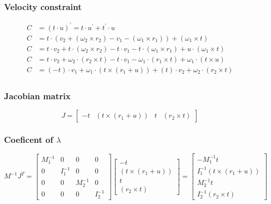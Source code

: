 \documentclass{article}
\begin{document}
	\subsubsection{Velocity constraint}
	\begin{align*}
		C &= (t\cdot u)^{'} = t\cdot u^{'} + t^{'}\cdot u\\
		C &= t\cdot (v_2+(\omega_2\times r_2)-v_1-(\omega_1\times r_1)) + (\omega_1\times t)\\
		C &= t\cdot v_2+ t\cdot (\omega_2\times r_2)- t\cdot v_1-t\cdot (\omega_1\times r_1) + u\cdot(\omega_1\times t)\\
		C &= t\cdot v_2+ \omega_2\cdot (r_2\times t)- t\cdot v_1-\omega_1\cdot (r_1\times t) + \omega_1\cdot(t\times u)\\
		C &= \boxed{(-t)}\cdot v_1 + \omega_1\cdot\boxed{(t\times(r_1+u))} +\boxed{(t)}\cdot v_2+ \omega_2\cdot \boxed{(r_2\times t)}\\
	\end{align*}
	\subsubsection{Jacobian matrix}
		$$
			J = 
			\begin{bmatrix}
				-t & (t\times(r_1+u)) & t & (r_2\times t)
			\end{bmatrix}
		$$
	\subsubsection{Coeficent of $\lambda$}
		$$
			M^{-1}J^T=	
			\begin{bmatrix}
				M_1^{-1} 	& 0 		& 0 		& 0\\
				0 			& I_1^{-1} 	& 0 		& 0\\
				0 			& 0 		& M_2^{-1} 	& 0\\
				0 			& 0 		& 0 		& I_2^{-1}
			\end{bmatrix}
			\begin{bmatrix}
				-t\\
				(t\times(r_1+u))\\
				t\\
				(r_2\times t)
			\end{bmatrix}
			=
			\begin{bmatrix}
				-M_1^{-1}t\\
				I_1^{-1}(t\times(r_1+u))\\
				M_2^{-1}t\\
				I_2^{-1}(r_2\times t)
			\end{bmatrix}
		$$
\end{document}

